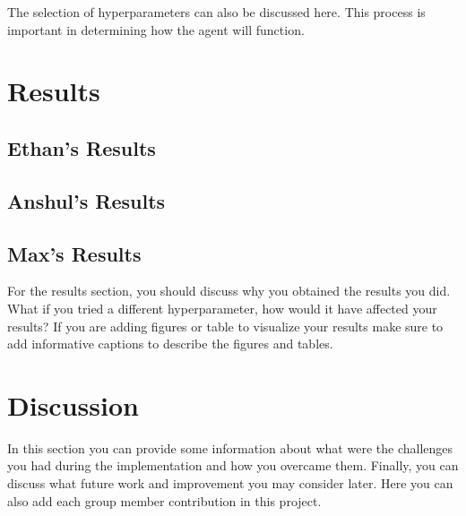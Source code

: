 \documentclass{article}
\begin{document}
The selection of hyperparameters can also be discussed here. This process is important in determining how the agent will function.


\section{Results}


\subsection{Ethan's Results}


\subsection{Anshul's Results}


\subsection{Max's Results}

For the results section, you should discuss why you obtained the results you did. What if you tried a different hyperparameter, how would it have affected your results?
If you are adding figures or table to visualize your results make sure to add informative captions to describe the figures and tables. 


\section{Discussion}

In this section you can provide some information about what were the challenges you had during the implementation and how you overcame them. Finally, you can discuss what future work and improvement you may consider later.
Here you can also add each group member contribution in this project. 





\end{document}

